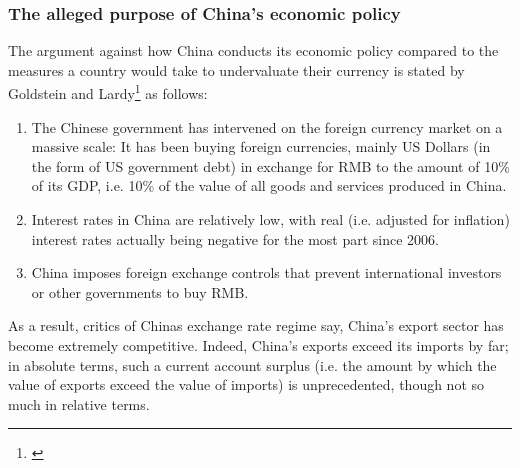 \documentclass[11pt]{article}
\begin{document}


\subsubsection{The alleged purpose of China's economic policy}

The argument against how China conducts its economic policy compared to 
the measures a country would take to undervaluate their currency is 
stated by Goldstein and Lardy\footnote{\cite[pp.  
40]{GoldsteinLardy2008}} as follows:

\begin{enumerate}
\item{The Chinese government has intervened on the foreign currency 
		market on a massive scale: It has been buying foreign 
		currencies, mainly US Dollars (in the form of US government 
		debt) in exchange for RMB to the amount of 10\% of its GDP, i.e. 
		10\% of the value of all goods and services produced in China.} 
\item{Interest rates in China are relatively low, with real (i.e. adjusted for inflation) interest rates actually being negative for the most part since 2006.} %
\item{China imposes foreign exchange controls that prevent international investors or other governments to buy RMB.}%
\end{enumerate}

As a result, critics of Chinas exchange rate regime say, China's export sector has become extremely competitive. Indeed, China's exports exceed its imports by far; in absolute terms, such a current account surplus (i.e. the amount by which the value of exports exceed the value of imports) is unprecedented, though not so much in relative terms. %
\end{document}
